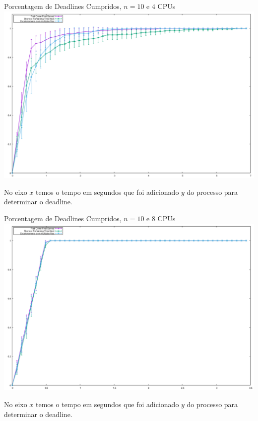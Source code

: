 \documentclass{beamer}
\begin{document}
\begin{frame}{Porcentagem de Deadlines Cumpridos, $n = 10$ e $4$ CPUs}
	\includegraphics[width=\textwidth]{graphs/testes_capella/result/deadlines-r4-10}
	
	{\tiny No eixo $x$ temos o tempo em segundos que foi adicionado $y$ do processo para determinar o deadline.}
\end{frame}


\begin{frame}{Porcentagem de Deadlines Cumpridos, $n = 10$ e $8$ CPUs}
	\includegraphics[width=\textwidth]{graphs/testes_capella/result/deadlines-r8-10}
	
	{\tiny No eixo $x$ temos o tempo em segundos que foi adicionado $y$ do processo para determinar o deadline.}
\end{frame}
\end{document}
